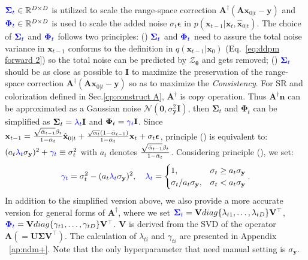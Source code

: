 \documentclass{article} \usepackage{iclr2023_conference,times}
\begin{document}
$\textcolor{blue}{\mathbf{\Sigma}_{t}}\in\mathbb{R}^{D\times D}$ is utilized to scale the range-space correction $\mathbf{A}^{\dagger}(\mathbf{A}\mathbf{x}_{0|t}-\mathbf{y})$ and  $\textcolor{blue}{\mathbf{\Phi}_{t}}\in\mathbb{R}^{D\times D}$ is used to scale the added noise $\sigma_{t}\boldsymbol{\epsilon}$ in $p(\mathbf{x}_{t-1}|\mathbf{x}_{t},\mathbf{\hat{x}}_{0|t})$. The choice of $\textcolor{blue}{\mathbf{\Sigma}_{t}}$ and $\textcolor{blue}{\mathbf{\Phi}_{t}}$ follows two principles: () $\textcolor{blue}{\mathbf{\Sigma}_{t}}$ and $\textcolor{blue}{\mathbf{\Phi}_{t}}$ need to assure the total noise variance in $\mathbf{x}_{t-1}$ conforms to the definition in $q(\mathbf{x}_{t-1}|\mathbf{x}_{0})$ (Eq.~\ref{eq:ddpm forward 2}) so the total noise can be predicted by $\mathcal{Z}_{\boldsymbol{\theta}}$ and gets removed; () $\textcolor{blue}{\mathbf{\Sigma}_{t}}$ should be as close as possible to $\mathbf{I}$ to maximize the preservation of the range-space correction $\mathbf{A}^{\dagger}(\mathbf{A}\mathbf{x}_{0|t}-\mathbf{y})$ so as to maximize the \textit{Consistency}. For SR and colorization defined in Sec.\ref{cp:construct A}, $\mathbf{A}^{\dagger}$ is copy operation. Thus $\mathbf{A}^{\dagger}\mathbf{n}$ can be approximated as a Gaussian noise $\mathcal{N}(\mathbf{0}, \sigma_{\mathbf{y}}^2\mathbf{I})$, then $\mathbf{\Sigma}_{t}$ and $\mathbf{\Phi}_{t}$ can be simplified as $\mathbf{\Sigma}_{t}=\textcolor{blue}{\lambda_t}\mathbf{I}$ and $\mathbf{\Phi}_{t}=\textcolor{blue}{\gamma_t}\mathbf{I}$. Since $\mathbf{x}_{t-1} = \frac{\sqrt{\Bar{\alpha}_{t-1}}\beta_{t}}{1-\Bar{\alpha}_{t}}\hat{\mathbf{x}}_{0|t}+ \frac{\sqrt{\alpha_{t}}(1-\Bar{\alpha}_{t-1})}{1-\Bar{\alpha}_{t}}\mathbf{x}_{t} + \sigma_{t}\boldsymbol{\epsilon}$, principle () is equivalent to: $(a_t\textcolor{blue}{\lambda_{t}}\sigma_{\mathbf{y}})^2+\textcolor{blue}{\gamma_t}\equiv\sigma_t^2$ with $a_t$ denotes $\frac{\sqrt{\Bar{\alpha}_{t-1}}\beta_{t}}{1-\Bar{\alpha}_{t}}$. Considering principle (), we set: 
\begin{equation}
    \textcolor{blue}{\gamma_{t}}=\sigma_t^2-(a_t\textcolor{blue}{\lambda_{t}}\sigma_{\mathbf{y}})^2,
    \quad
    \textcolor{blue}{\lambda_{t}}=\begin{cases}
        1, & \sigma_{t} \ge a_t\sigma_{\mathbf{y}} \\
        \sigma_{t}/a_t\sigma_{\mathbf{y}}, & \sigma_{t} < a_t\sigma_{\mathbf{y}}
        \end{cases}.
    \label{eq:ddnm+ handdesigne}
\end{equation}
In addition to the simplified version above, we also provide a more accurate version for general forms of $\mathbf{A}^{\dagger}$, where we set $\textcolor{blue}{\mathbf{\Sigma}_{t}}=\mathbf{V}diag\{\lambda_{t1}, \dots, \lambda_{tD}\}\mathbf{V}^{\top}$, $\textcolor{blue}{\mathbf{\Phi}_{t}}=\mathbf{V}diag\{\gamma_{t1}, \dots, \gamma_{tD}\}\mathbf{V}^{\top}$. $\mathbf{V}$ is derived from the SVD of the operator 
$\mathbf{A}(=\mathbf{U}\mathbf{\Sigma}\mathbf{V}^{\top})$. The calculation of $\lambda_{ti}$ and $\gamma_{ti}$ are presented in Appendix ~\ref{ap:ndm+}. Note that the only hyperparameter that need manual setting is $\sigma_{\mathbf{y}}$.
\end{document}
